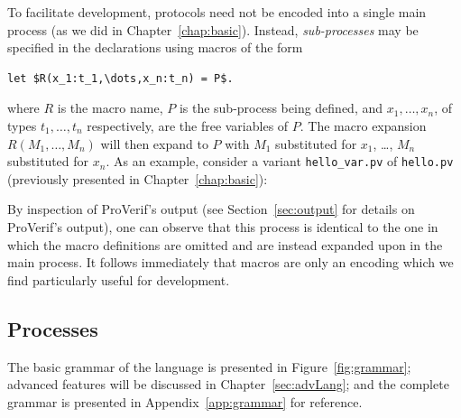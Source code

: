 \documentclass{book}
\begin{document}
To facilitate development, protocols need not be encoded into a single main process (as we did in Chapter~\ref{chap:basic}). Instead, \emph{sub-processes} may be specified in the declarations using macros of the form
%
\begin{lstlisting}[numbers=none]
let $R(x_1:t_1,\dots,x_n:t_n) = P$.
\end{lstlisting}
%
where $R$ is the macro name, $P$ is the sub-process being defined, and $x_1,\ldots,x_n$, of types $t_1,\ldots,t_n$ respectively, are the free variables of $P$.
The macro expansion $R(M_1, \ldots, M_n)$ will then expand to $P$ with $M_1$ substituted for $x_1$, \ldots, $M_n$ substituted for $x_n$.
As an example, consider a variant \texttt{{\docexdir}hello\_var.pv} of \texttt{{\docexdir}hello.pv} (previously presented in Chapter~\ref{chap:basic}):
%

%
By inspection of ProVerif's output (see Section~\ref{sec:output} for details on ProVerif's output), one can observe that this process is identical to the one in which the macro definitions are omitted and are instead expanded upon in the main process.  It follows immediately that macros are only an encoding which we find particularly useful for development.


%
%
%
%
%




\subsection{Processes}\label{sec:main}

The basic grammar of the language is presented in Figure~\ref{fig:grammar};
advanced features will be discussed in Chapter~\ref{sec:advLang}; and the
complete grammar is presented in Appendix~\ref{app:grammar} for reference.
\end{document}
